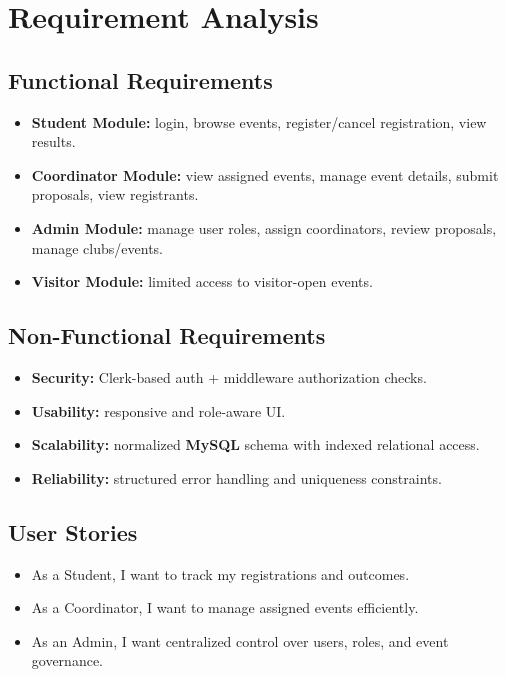 \documentclass[12pt, a4paper]{article}
\begin{document}
\newpage
\section{Requirement Analysis}
\subsection{Functional Requirements}
\begin{itemize}
    \item \textbf{Student Module:} login, browse events, register/cancel registration, view results.
    \item \textbf{Coordinator Module:} view assigned events, manage event details, submit proposals, view registrants.
    \item \textbf{Admin Module:} manage user roles, assign coordinators, review proposals, manage clubs/events.
    \item \textbf{Visitor Module:} limited access to visitor-open events.
\end{itemize}

\subsection{Non-Functional Requirements}
\begin{itemize}
    \item \textbf{Security:} Clerk-based auth + middleware authorization checks.
    \item \textbf{Usability:} responsive and role-aware UI.
    \item \textbf{Scalability:} normalized \textbf{MySQL} schema with indexed relational access.
    \item \textbf{Reliability:} structured error handling and uniqueness constraints.
\end{itemize}

\subsection{User Stories}
\begin{itemize}
    \item As a Student, I want to track my registrations and outcomes.
    \item As a Coordinator, I want to manage assigned events efficiently.
    \item As an Admin, I want centralized control over users, roles, and event governance.
\end{itemize}
\end{document}
